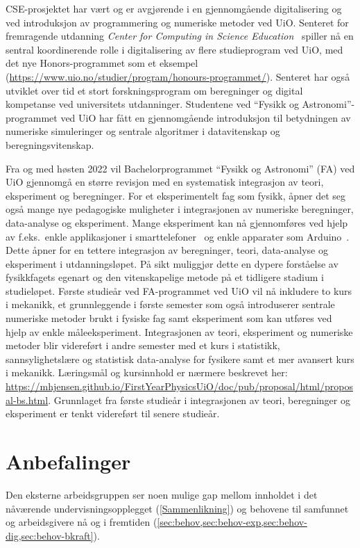 \documentclass{article}
\begin{document}
CSE-prosjektet har vært og er avgjørende i en gjennomgående digitalisering og ved introduksjon av programmering og numeriske metoder ved UiO. Senteret for fremragende utdanning \emph{Center for Computing in Science Education}~\cite{UiOCCSE} spiller nå en sentral koordinerende rolle i digitalisering av flere studieprogram ved UiO, med det nye Honors-programmet som et eksempel (\url{https://www.uio.no/studier/program/honours-programmet/}). Senteret har også utviklet over tid et stort forskningsprogram om beregninger og digital kompetanse ved universitets utdanninger. Studentene ved ``Fysikk og Astronomi''-programmet ved UiO har fått en gjennomgående introduksjon til betydningen av numeriske simuleringer og sentrale algoritmer i datavitenskap og beregningsvitenskap.

Fra og med høsten 2022 vil Bachelorprogrammet ``Fysikk og Astronomi'' (FA) ved UiO gjennomgå en større revisjon med en systematisk integrasjon av teori, eksperiment og beregninger.
For et eksperimentelt fag som fysikk, åpner det seg også mange nye pedagogiske muligheter i integrasjonen av numeriske beregninger, data-analyse og eksperiment. Mange eksperiment kan nå gjennomføres ved hjelp av f.eks.~enkle applikasjoner i smarttelefoner~\cite{phyphox} og enkle apparater som Arduino~\cite{arduino}. Dette åpner for en tettere integrasjon av beregninger, teori, data-analyse og eksperiment i utdanningsløpet. På sikt muliggjør dette en dypere forståelse av fysikkfagets egenart og den vitenskapelige metode på et tidligere stadium i studieløpet.  Første studieår ved FA-programmet ved UiO vil nå inkludere to kurs i mekanikk, et grunnleggende i første semester som også introduserer sentrale numeriske metoder brukt i fysiske fag samt eksperiment som kan utføres ved hjelp av enkle måleeksperiment. Integrasjonen av teori, eksperiment og numeriske metoder blir videreført i andre semester med et kurs i statistikk, sannsylighetslære og statistisk data-analyse for fysikere samt et mer avansert kurs i mekanikk.
Læringsmål og kursinnhold er nærmere beskrevet her: \url{https://mhjensen.github.io/FirstYearPhysicsUiO/doc/pub/proposal/html/proposal-bs.html}.
Grunnlaget fra første studieår i integrasjonen av teori, beregninger og eksperiment er tenkt videreført til senere studieår.

\section{Anbefalinger}
\label{sec:anbefalinger}
Den eksterne arbeidsgruppen ser noen mulige gap mellom innholdet i det nåværende undervisningsopplegget (\cref{Sammenlikning}) og behovene til samfunnet og arbeidsgivere nå og i fremtiden (\cref{sec:behov,sec:behov-exp,sec:behov-dig,sec:behov-bkraft}). 
\end{document}
